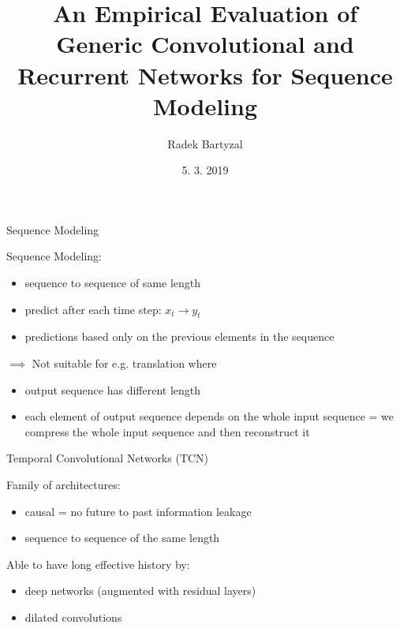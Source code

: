 \documentclass{beamer}
\begin{document}
\title{An Empirical Evaluation of Generic Convolutional and Recurrent Networks for Sequence Modeling}  
\author{Radek Bartyzal}
\date{5. 3. 2019} 

\frame{\titlepage} 

\begin{frame}{Sequence Modeling}

Sequence Modeling:
\begin{itemize}
\item  sequence to sequence of same length
\item predict after each time step: $x_t \rightarrow y_t$
\item predictions based only on the previous elements in the sequence
\end{itemize}

\vfill

$\implies$ Not suitable for e.g. translation where 
\begin{itemize}
\item output sequence has different length
\item each element of output sequence depends on the whole input sequence = we compress the whole input sequence and then reconstruct it 
\end{itemize}

\end{frame}

\begin{frame}{Temporal Convolutional Networks (TCN)}

Family of architectures:
\begin{itemize}
\item causal = no future to past information leakage
\item sequence to sequence of the same length
\end{itemize}

\vfill

Able to have long effective history by:
\begin{itemize}
\item deep networks (augmented with residual layers) 
\item dilated convolutions
\end{itemize}


\end{frame}
\end{document}
